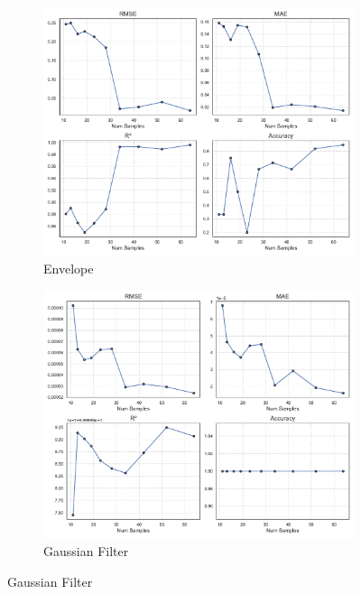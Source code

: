 \begin{figure}[htbp]
    \centering
    \begin{subfigure}[t]{0.32\textwidth}
        \includegraphics[width=\textwidth]{assets/images/05/metrics_evolution_by_sample_size_envelope}
        \caption{Envelope}
    \end{subfigure}
    \hfill
    \begin{subfigure}[t]{0.32\textwidth}
        \includegraphics[width=\textwidth]{assets/images/05/metrics_evolution_by_sample_size_gaussian-filter}
        \caption{Gaussian Filter}
    \end{subfigure}

\end{figure}
